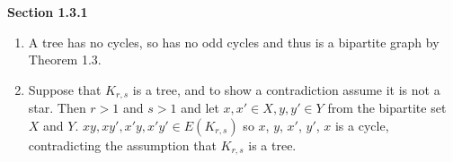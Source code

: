 \documentclass[11pt]{article}
\begin{document}
{\bfseries Section 1.3.1}

\begin{enumerate}[3]
    \item
        A tree has no cycles, so has no odd cycles and thus is a bipartite graph by
        Theorem 1.3. 
    \item
        Suppose that $K_{r,s}$ is a tree, and to show a contradiction assume 
        it is not a star. Then $r > 1$ and $s > 1$ and let $x, x' \in X,
        y, y' \in Y$ from the bipartite set $X$ and $Y$. $xy, xy', x'y, x'y' 
        \in E(K_{r,s})$ so $x$, $y$, $x'$, $y'$, $x$ is a cycle, contradicting 
        the assumption that $K_{r,s}$ is a tree. 
\end{enumerate}
\end{document}
